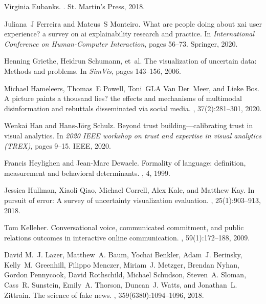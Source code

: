 \documentclass{article}
\begin{document}
\begin{thebibliography}{10}
Virginia Eubanks.
.
\newblock St. Martin's Press, 2018.

Juliana~J Ferreira and Mateus~S Monteiro.
\newblock What are people doing about xai user experience? a survey on ai
  explainability research and practice.
\newblock In {\em International Conference on Human-Computer Interaction},
  pages 56--73. Springer, 2020.

Henning Griethe, Heidrun Schumann, et~al.
\newblock The visualization of uncertain data: Methods and problems.
\newblock In {\em SimVis}, pages 143--156, 2006.

Michael Hameleers, Thomas~E Powell, Toni~GLA Van Der~Meer, and Lieke Bos.
\newblock A picture paints a thousand lies? the effects and mechanisms of
  multimodal disinformation and rebuttals disseminated via social media.
, 37(2):281--301, 2020.

Wenkai Han and Hans-J{\"o}rg Schulz.
\newblock Beyond trust building—calibrating trust in visual analytics.
\newblock In {\em 2020 IEEE workshop on trust and expertise in visual analytics
  (TREX)}, pages 9--15. IEEE, 2020.

Francis Heylighen and Jean-Marc Dewaele.
\newblock Formality of language: definition, measurement and behavioral
  determinants.
, 4, 1999.

Jessica Hullman, Xiaoli Qiao, Michael Correll, Alex Kale, and Matthew Kay.
\newblock In pursuit of error: A survey of uncertainty visualization
  evaluation.
,
  25(1):903--913, 2018.

Tom Kelleher.
\newblock Conversational voice, communicated commitment, and public relations
  outcomes in interactive online communication.
, 59(1):172--188, 2009.

David M.~J. Lazer, Matthew~A. Baum, Yochai Benkler, Adam~J. Berinsky, Kelly~M.
  Greenhill, Filippo Menczer, Miriam~J. Metzger, Brendan Nyhan, Gordon
  Pennycook, David Rothschild, Michael Schudson, Steven~A. Sloman, Cass~R.
  Sunstein, Emily~A. Thorson, Duncan~J. Watts, and Jonathan~L. Zittrain.
\newblock The science of fake news.
, 359(6380):1094--1096, 2018.


\end{thebibliography}
\end{document}
